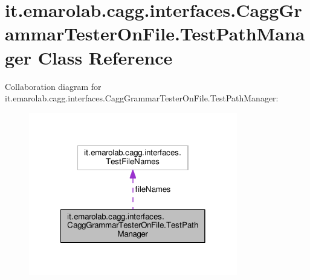 \hypertarget{classit_1_1emarolab_1_1cagg_1_1interfaces_1_1CaggGrammarTesterOnFile_1_1TestPathManager}{\section{it.\-emarolab.\-cagg.\-interfaces.\-Cagg\-Grammar\-Tester\-On\-File.\-Test\-Path\-Manager Class Reference}
\label{classit_1_1emarolab_1_1cagg_1_1interfaces_1_1CaggGrammarTesterOnFile_1_1TestPathManager}
}


Collaboration diagram for it.\-emarolab.\-cagg.\-interfaces.\-Cagg\-Grammar\-Tester\-On\-File.\-Test\-Path\-Manager\-:\nopagebreak
\begin{figure}[H]
\begin{center}
\leavevmode
\includegraphics[width=258pt]{classit_1_1emarolab_1_1cagg_1_1interfaces_1_1CaggGrammarTesterOnFile_1_1TestPathManager__coll__graph}
\end{center}
\end{figure}
